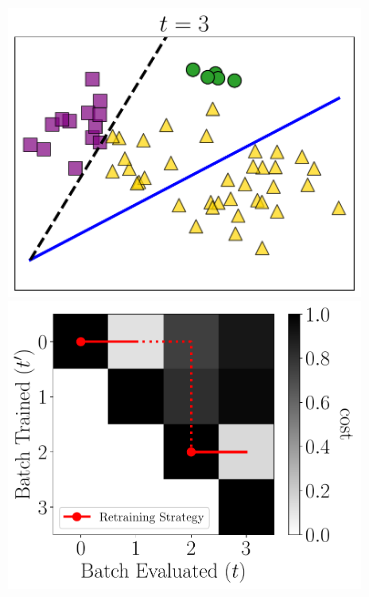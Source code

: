 \documentclass[pdf]{beamer}
\begin{document}
\begin{frame}
\begin{minipage}{0.5\textwidth}
\begin{center}
              \includegraphics[width=0.7\textwidth]{figs/near_queries_illustration.pdf}\\[1mm]
              \includegraphics[width=0.7\textwidth]{figs/near_queries.pdf}
          \end{center}
        \end{minipage}%
    

\end{frame}
\end{document}
